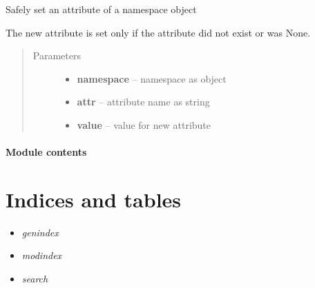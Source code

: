 \documentclass[letterpaper,10pt,english]{sphinxmanual}
\begin{document}
\begin{fulllineitems}
\label{_rst/pyscaffold:pyscaffold.utils.safe_set}
Safely set an attribute of a namespace object

The new attribute is set only if the attribute did not exist or was None.
\begin{quote}\begin{description}
\item[{Parameters}] \leavevmode\begin{itemize}
\item {} 
\textbf{namespace} -- namespace as \href{http://docs.python.org/2.7/library/argparse.html\#argparse.Namespace}{} object

\item {} 
\textbf{attr} -- attribute name as string

\item {} 
\textbf{value} -- value for new attribute

\end{itemize}

\end{description}\end{quote}

\end{fulllineitems}



\subsubsection{Module contents}
\label{_rst/pyscaffold:module-contents}\label{_rst/pyscaffold:module-pyscaffold}

\chapter{Indices and tables}
\label{index:indices-and-tables}\begin{itemize}
\item {} 
\emph{genindex}

\item {} 
\emph{modindex}

\item {} 
\emph{search}

\end{itemize}
\end{document}
